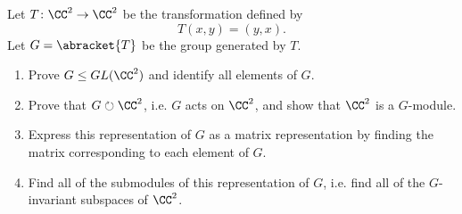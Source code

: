 \documentclass{math174}
\date{Monday, February 4}
\author{}
\begin{document}
Let \(T \colon \CC^2 \to \CC^2\) be the transformation defined by
\[
  T(x, y) = (y, x).
\]
Let \(G = \abracket{T}\) be the group generated by \(T\).
\begin{enumerate}[label=(\arabic*)]
\item Prove \(G \le GL(\CC^2)\) and identify all elements of \(G\).

  \begin{solution}
  \end{solution}

\item Prove that \(G \circlearrowright \CC^2\), i.e. \(G\) acts on
  \(\CC^2\), and show that \(\CC^2\) is a \(G\)-module.

  \begin{solution}
  \end{solution}

\item Express this representation of \(G\) as a matrix representation
  by finding the matrix corresponding to each element of \(G\).

  \begin{solution}
  \end{solution}

\item Find all of the submodules of this representation of \(G\),
  i.e. find all of the \(G\)-invariant subspaces of \(\CC^2\).

  \begin{solution}
  \end{solution}
\end{enumerate}
\end{document}
